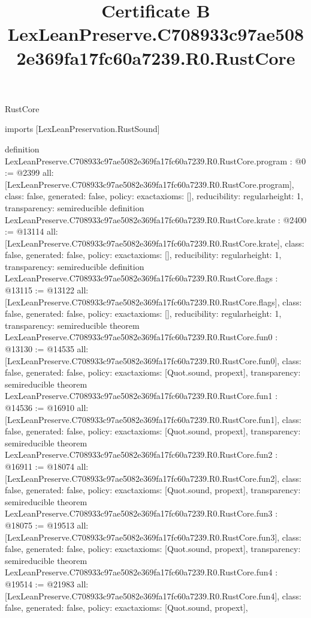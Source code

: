 \begin{lexlean}{RustCore}
\title{Certificate B LexLeanPreserve.C708933c97ae5082e369fa17fc60a7239.R0.RustCore}
\begin{coremodule}
imports [LexLeanPreservation.RustSound]

definition LexLeanPreserve.C708933c97ae5082e369fa17fc60a7239.R0.RustCore.program : @0 := @2399 {
  all: [LexLeanPreserve.C708933c97ae5082e369fa17fc60a7239.R0.RustCore.program],
  class: false,
  generated: false,
  policy: exact{axioms: []},
  reducibility: regular{height: 1},
  transparency: semireducible
}
definition LexLeanPreserve.C708933c97ae5082e369fa17fc60a7239.R0.RustCore.krate : @2400 := @13114 {
  all: [LexLeanPreserve.C708933c97ae5082e369fa17fc60a7239.R0.RustCore.krate],
  class: false,
  generated: false,
  policy: exact{axioms: []},
  reducibility: regular{height: 1},
  transparency: semireducible
}
definition LexLeanPreserve.C708933c97ae5082e369fa17fc60a7239.R0.RustCore.flags : @13115 := @13122 {
  all: [LexLeanPreserve.C708933c97ae5082e369fa17fc60a7239.R0.RustCore.flags],
  class: false,
  generated: false,
  policy: exact{axioms: []},
  reducibility: regular{height: 1},
  transparency: semireducible
}
theorem LexLeanPreserve.C708933c97ae5082e369fa17fc60a7239.R0.RustCore.fun0 : @13130 := @14535 {
  all: [LexLeanPreserve.C708933c97ae5082e369fa17fc60a7239.R0.RustCore.fun0],
  class: false,
  generated: false,
  policy: exact{axioms: [Quot.sound, propext]},
  transparency: semireducible
}
theorem LexLeanPreserve.C708933c97ae5082e369fa17fc60a7239.R0.RustCore.fun1 : @14536 := @16910 {
  all: [LexLeanPreserve.C708933c97ae5082e369fa17fc60a7239.R0.RustCore.fun1],
  class: false,
  generated: false,
  policy: exact{axioms: [Quot.sound, propext]},
  transparency: semireducible
}
theorem LexLeanPreserve.C708933c97ae5082e369fa17fc60a7239.R0.RustCore.fun2 : @16911 := @18074 {
  all: [LexLeanPreserve.C708933c97ae5082e369fa17fc60a7239.R0.RustCore.fun2],
  class: false,
  generated: false,
  policy: exact{axioms: [Quot.sound, propext]},
  transparency: semireducible
}
theorem LexLeanPreserve.C708933c97ae5082e369fa17fc60a7239.R0.RustCore.fun3 : @18075 := @19513 {
  all: [LexLeanPreserve.C708933c97ae5082e369fa17fc60a7239.R0.RustCore.fun3],
  class: false,
  generated: false,
  policy: exact{axioms: [Quot.sound, propext]},
  transparency: semireducible
}
theorem LexLeanPreserve.C708933c97ae5082e369fa17fc60a7239.R0.RustCore.fun4 : @19514 := @21983 {
  all: [LexLeanPreserve.C708933c97ae5082e369fa17fc60a7239.R0.RustCore.fun4],
  class: false,
  generated: false,
  policy: exact{axioms: [Quot.sound, propext]},
}
\end{coremodule}
\end{lexlean}
